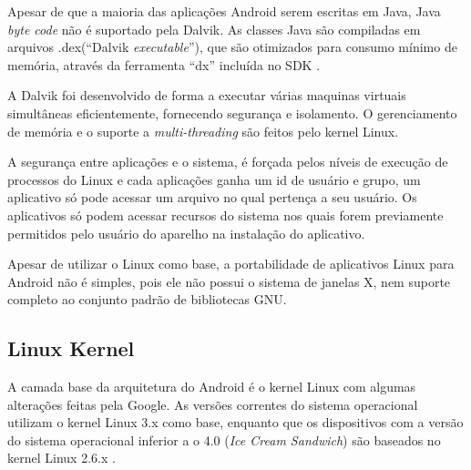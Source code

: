 Apesar de que a maioria das aplicações Android serem escritas em Java, 
Java \textit{byte code} não é suportado pela Dalvik.
As classes Java são compiladas em arquivos .dex(``Dalvik \textit{executable}''), 
que são otimizados para consumo mínimo de memória,
através da ferramenta ``dx'' incluída no SDK \cite{android0}.

A Dalvik foi desenvolvido de forma a executar várias maquinas virtuais simultâneas eficientemente, 
fornecendo segurança e isolamento. O gerenciamento de memória
e o suporte a \textit{multi-threading} são feitos pelo kernel Linux. 

A segurança entre aplicações e o sistema, é forçada pelos níveis de execução de 
processos do Linux\cite{niveisExec} e cada aplicações ganha um id de usuário e grupo, um 
aplicativo só pode acessar um arquivo no qual pertença a seu usuário. 
Os aplicativos só podem acessar recursos do sistema nos quais forem previamente 
permitidos pelo usuário do aparelho na instalação do aplicativo.

  Apesar de utilizar o Linux como base, a portabilidade de aplicativos Linux
   para Android não é simples, pois ele não possui o sistema de janelas X, 
   nem suporte completo ao conjunto padrão de bibliotecas GNU.

\subsection{Linux Kernel}

A camada base da arquitetura do Android é o kernel Linux com algumas alterações feitas pela Google. 
As versões correntes do sistema operacional utilizam o kernel Linux 3.x como base, enquanto que os dispositivos 
 com a versão do sistema operacional inferior a o 4.0 (\textit{Ice Cream Sandwich}) são baseados no kernel Linux 2.6.x \cite{android1}.

